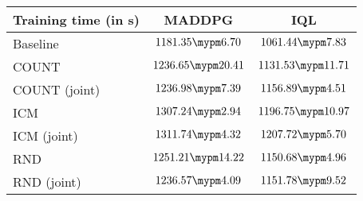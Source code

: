 \begin{tabular}{l | c c}
	Training time (in s) & MADDPG & IQL\\ \toprule
		Baseline & $1181.35 \mypm 6.70$ & $1061.44 \mypm 7.83$ \\ \midrule
	COUNT & $1236.65 \mypm 20.41$ & $1131.53 \mypm 11.71$ \\
	COUNT (joint) & $1236.98 \mypm 7.39$ & $1156.89 \mypm 4.51$ \\\midrule
	ICM & $1307.24 \mypm 2.94$ & $1196.75 \mypm 10.97$ \\
	ICM (joint) & $1311.74 \mypm 4.32$ & $1207.72 \mypm 5.70$ \\\midrule
	RND & $1251.21 \mypm 14.22$ & $1150.68 \mypm 4.96$ \\
	RND (joint) & $1236.57 \mypm 4.09$ & $1151.78 \mypm 9.52$ \\\midrule
\end{tabular}
